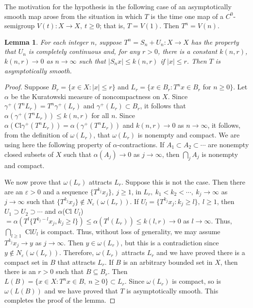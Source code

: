 \documentclass{surv-l}
\theoremstyle{plain}
\newtheorem{lemma}[theorem]{Lemma}
\theoremstyle{definition}
\numberwithin{equation}{section}
\numberwithin{figure}{chapter}
\begin{document}
The motivation for the hypothesis in the following case of an asymptotically smooth map arose from the situation in which $T$ is the time one map of a $C^{0}$-semigroup $V(t)\!:X\rightarrow X,\ t\geq 0$; that is, $T=V(1)$. Then $T^{n}=V(n)$.

\begin{lemma}\label{lem2.3.2} For each integer $n$, suppose $T^{n}=S_{n}+U_{n}\!:X\rightarrow X$ has the property that $U_{n}$ is completely continuous and, for any $r>0$, there is a constant $k(n, r)$, $k(n, r)\rightarrow 0$ as $ n\rightarrow\infty$ such that $|S_{n}x|\leq k(n, r)$ if $|x|\leq r$. Then $T$ is asymptotically smooth.
\end{lemma}

\begin{proof}
Suppose $B_{r}=\{x\in X\!:|x|\leq r\}$ and $L_{r}=\{x\in B_{r}:T^{n}x\in B_{r}$ for $n\geq 0\}$. Let $\alpha$ be the Kuratowski measure of noncompactness on $X$. Since $\gamma^{+}(T^{n}L_{r})=T^{n}\gamma^{+}(L_{r})$ and $\gamma^{+}(L_{r})\subset B_{r}$, it follows that $\alpha(\gamma^{+}(T^{n}L_{r}))\leq k(n, r)$ for all $n$. Since $\alpha(\mathrm{Cl}\gamma^{+}(T^{n}L_{r}))=\alpha(\gamma^{+}(T^{n}L_{r}))$ and $k(n, r)\rightarrow 0$ as $ n\rightarrow\infty$, it follows, from the definition of $\omega(L_{r})$, that $\omega(L_{r})$ is nonempty and compact. We are using here the following property of $\alpha$-contractions. If $ A_{1}\subset A_{2}\subset\cdots$ are nonempty closed subsets of $X$ such that $\alpha(A_{j})\rightarrow 0$ as $ j\rightarrow\infty$, then $ \bigcap_{j}A_{j}$ is nonempty and compact.

We now prove that $\omega(L_{r})$ attracts $L_{r}$. Suppose this is not the case. Then there are an $\varepsilon >0$ and a sequence $\{T^{k_{j}} x_{j}\},\ j\geq 1$, in $L_{r},\ k_{1}<k_{2}< \cdots,\ k_{j}\rightarrow\infty$ as $ j\rightarrow\infty$ such that $\{T^{k_{j}}x_{j}\}\not\in N_{\varepsilon}(\omega(L_{r}))$. If $U_{l}=\{T^{k_{j}}x_{j}\!:k_{j}\geq l\},\ l\geq 1$, then $ U_{1}\supset U_{2}\supset \cdots$ and $\alpha$(Cl $U_{l}$) $=\alpha(T^{l}\{T^{k_{j}-l}x_{j}, k_{j}\geq l\})\leq\alpha(T^{l}(L_{r}))\leq k(l, r)\rightarrow 0$ as $ l\rightarrow\infty$. Thus, $\bigcap_{l\geq 1}$ Cl$U_{l}$ is compact. Thus, without loss of generality, we may assume $T^{k_{j}}x_{j}\rightarrow y$ as $ j\rightarrow\infty$. Then $y\in\omega(L_{r})$, but this is a contradiction since $y\not\in N_{\varepsilon}(\omega(L_{r}))$. Therefore, $\omega(L_{r})$ attracts $L_{r}$ and we have proved there is a compact set in $B$ that attracts $L_{r}$. If $B$ is an arbitrary bounded set in $X$, then there is an $r>0$ such that $B\subseteq B_{r}$. Then $L(B)=\{x\in X\!:T^{n}x\in B,\ n\geq 0\}\subset L_{r}$. Since $\omega(L_{r})$ is compact, so is $\omega(L(B))$ and we have proved that $T$ is asymptotically smooth. This completes the proof of the lemma.


\end{proof}
\end{document}

